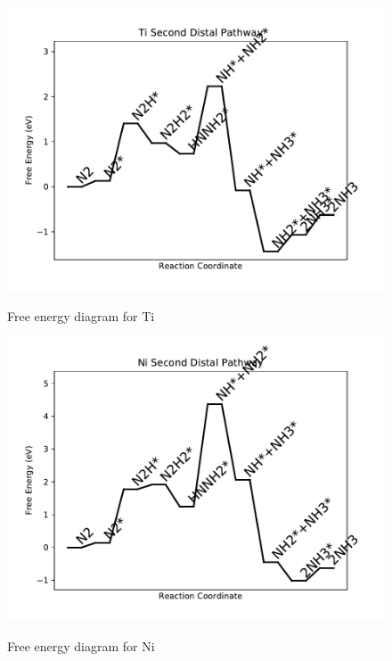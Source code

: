 \documentclass{article}
\begin{document}
\newpage
\begin{figure}
\includegraphics[width=1\linewidth]{data/plots/Ti_distal_2.pdf}
\label{fig:Ti_distal_2}
\caption{Free energy diagram for Ti}
\end{figure}

\begin{figure}
\includegraphics[width=1\linewidth]{data/plots/Ni_distal_2.pdf}
\label{fig:Ni_distal_2}
\caption{Free energy diagram for Ni}
\end{figure}
\end{document}
